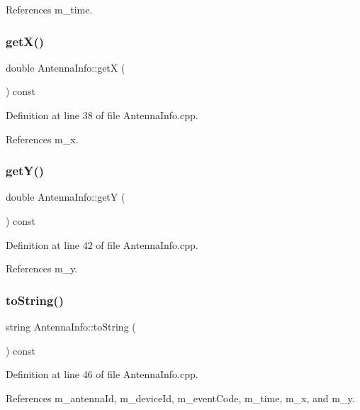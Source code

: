 References m\+\_\+time.

\mbox{\label{class_antenna_info_a3817cba0231888dc5977105ace0faddb}} 
\subsubsection{get\+X()}
{\footnotesize\ttfamily double Antenna\+Info\+::getX (\begin{DoxyParamCaption}{ }\end{DoxyParamCaption}) const}



Definition at line 38 of file Antenna\+Info.\+cpp.



References m\+\_\+x.

\mbox{\label{class_antenna_info_aa385e3e85d783b81d69014a64b5fc94f}} 
\subsubsection{get\+Y()}
{\footnotesize\ttfamily double Antenna\+Info\+::getY (\begin{DoxyParamCaption}{ }\end{DoxyParamCaption}) const}



Definition at line 42 of file Antenna\+Info.\+cpp.



References m\+\_\+y.

\mbox{\label{class_antenna_info_ab8c9e530f1a7adeb9ca4bb6bc4c4af1a}} 
\subsubsection{to\+String()}
{\footnotesize\ttfamily string Antenna\+Info\+::to\+String (\begin{DoxyParamCaption}{ }\end{DoxyParamCaption}) const}



Definition at line 46 of file Antenna\+Info.\+cpp.



References m\+\_\+antenna\+Id, m\+\_\+device\+Id, m\+\_\+event\+Code, m\+\_\+time, m\+\_\+x, and m\+\_\+y.



